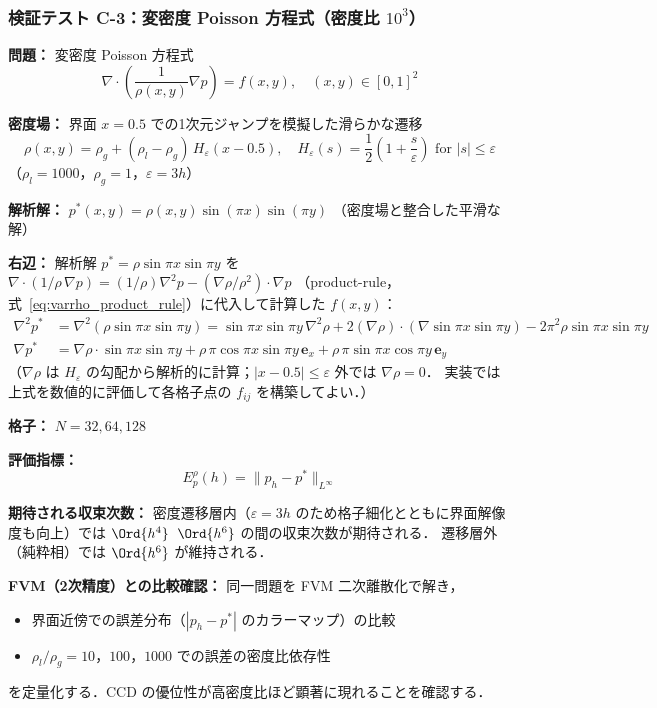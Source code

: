 \subsubsection{検証テスト C-3：変密度 Poisson 方程式（密度比 $10^3$）}
\label{sec:ccd_test_c3}

\begin{tcolorbox}[algbox, title={テスト C-3 の設定}]
\textbf{問題：} 変密度 Poisson 方程式
\[
  \nabla\cdot\!\left(\frac{1}{\rho(x,y)}\nabla p\right) = f(x,y),
  \quad (x,y) \in [0,1]^2
\]

\textbf{密度場：} 界面 $x = 0.5$ での1次元ジャンプを模擬した滑らかな遷移
\[
  \rho(x,y) = \rho_g + (\rho_l - \rho_g)\,H_\varepsilon(x - 0.5),
  \quad
  H_\varepsilon(s) = \frac{1}{2}\!\left(1 + \frac{s}{\varepsilon}\right) \text{ for } |s| \le \varepsilon
\]
（$\rho_l = 1000$，$\rho_g = 1$，$\varepsilon = 3h$）

\textbf{解析解：} $p^*(x,y) = \rho(x,y)\sin(\pi x)\sin(\pi y)$
（密度場と整合した平滑な解）

\textbf{右辺：} 解析解 $p^* = \rho\sin\pi x\sin\pi y$ を
$\nabla\cdot(1/\rho\,\nabla p) = (1/\rho)\nabla^2 p - (\nabla\rho/\rho^2)\cdot\nabla p$
（product-rule，式~\eqref{eq:varrho_product_rule}）に代入して計算した $f(x,y)$：
\begin{align*}
  \nabla^2 p^* &= \nabla^2(\rho\sin\pi x\sin\pi y)
  = \sin\pi x\sin\pi y\,\nabla^2\rho
    + 2(\nabla\rho)\cdot(\nabla\sin\pi x\sin\pi y)
    - 2\pi^2\rho\sin\pi x\sin\pi y \\
  \nabla p^* &= \nabla\rho\cdot\sin\pi x\sin\pi y
    + \rho\,\pi\cos\pi x\sin\pi y\,\bm{e}_x
    + \rho\,\pi\sin\pi x\cos\pi y\,\bm{e}_y
\end{align*}
（$\nabla\rho$ は $H_\varepsilon$ の勾配から解析的に計算；$|x-0.5|\le\varepsilon$ 外では $\nabla\rho=0$．
実装では上式を数値的に評価して各格子点の $f_{ij}$ を構築してよい．）

\textbf{格子：} $N = 32, 64, 128$

\textbf{評価指標：}
\[
  E_p^{\rho}(h) = \|p_h - p^*\|_{L^\infty}
\]

\textbf{期待される収束次数：}
密度遷移層内（$\varepsilon = 3h$ のため格子細化とともに界面解像度も向上）では
$\Ord{h^4}$~$\Ord{h^6}$ の間の収束次数が期待される．
遷移層外（純粋相）では $\Ord{h^6}$ が維持される．

\textbf{FVM（2次精度）との比較確認：}
同一問題を FVM 二次離散化で解き，
\begin{itemize}
  \item 界面近傍での誤差分布（$|p_h - p^*|$ のカラーマップ）の比較
  \item $\rho_l/\rho_g = 10$，$100$，$1000$ での誤差の密度比依存性
\end{itemize}
を定量化する．CCD の優位性が高密度比ほど顕著に現れることを確認する．
\end{tcolorbox}

